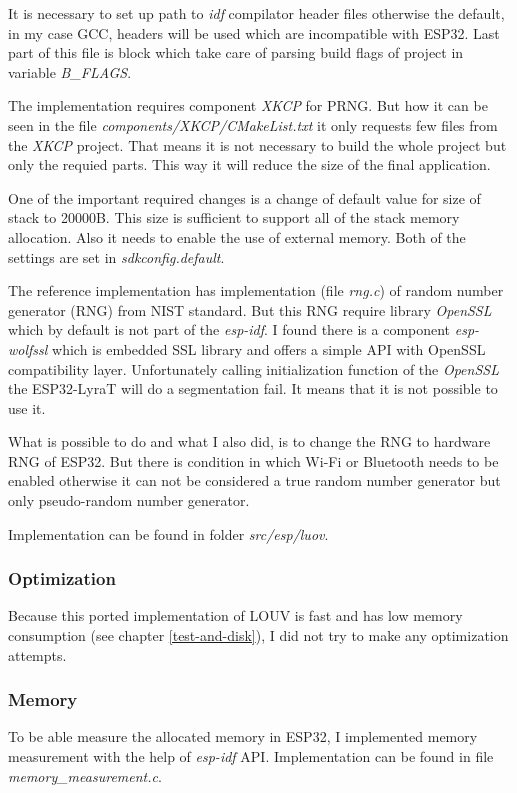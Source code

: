 \documentclass[thesis=M,english]{FITthesis}[2019/12/23]
\begin{document}
\noindent
It is necessary to set up path to \textit{idf} compilator header files otherwise the default, in my case GCC, headers will be used which are incompatible with ESP32.
Last part of this file is block which take care of parsing build flags of project in variable \textit{B\_FLAGS}. 

\bigskip
\noindent
The implementation requires component \textit{XKCP} for PRNG. But how it can be seen in the file \textit{components/XKCP/CMakeList.txt} it only requests few files from the \textit{XKCP} project. That means it is not necessary to build the whole project but only the requied parts. This way it will reduce the size of the final application. 

\bigskip
\noindent
One of the important required changes is a change of default value for size of stack to 20000B. This size is sufficient to support all of the stack memory allocation. Also it needs to enable the use of external memory. Both of the settings are set in \textit{sdkconfig.default}.

\bigskip
\noindent
The reference implementation has implementation (file \textit{rng.c}) of random number generator (RNG) from NIST standard. But this RNG require library \textit{OpenSSL} which by default is not part of the \textit{esp-idf}. I found there is a component \textit{esp-wolfssl} which is embedded SSL library and offers a simple API with OpenSSL compatibility layer. Unfortunately calling initialization function of the \textit{OpenSSL} the ESP32-LyraT will do a segmentation fail. It means that it is not possible to use it.

\bigskip
\noindent
What is possible to do and what I also did, is to change the RNG to hardware RNG of ESP32. But there is condition in which Wi-Fi or Bluetooth needs to be enabled otherwise it can not be considered a true random number generator but only pseudo-random number generator.

\bigskip
\noindent
Implementation can be found in folder \textit{src/esp/luov}. 

\subsubsection{Optimization}
Because this ported implementation of LOUV is fast and has low memory consumption (see chapter \ref{test-and-disk}), I did not try to make any optimization attempts. 

\subsubsection{Memory} \label{esp-luov-memory}
To be able measure the allocated memory in ESP32, I implemented memory measurement with the help of \textit{esp-idf} API. Implementation can be found in file \textit{memory\_measurement.c}.
\end{document}
